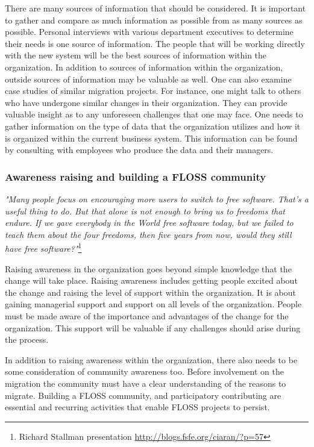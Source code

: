    There are many sources of information that should be considered. It is important to gather and compare as much information as possible from as many sources as possible. Personal interviews with various department executives to determine their needs is one source of information. The people that will be working directly with the new system will be the best sources of information within the organization.  In addition to sources of information within the organization, outside sources of information may be valuable as well. One can also examine case studies of similar migration projects. For instance, one might talk to others who have undergone similar changes in their organization. They can provide valuable insight as to any unforeseen challenges that one may face. One needs to gather information on the type of data that the organization utilizes and how it is organized within the current business system.  This information can be found by consulting with employees who produce the data and their managers.
    
    \subsubsection{Awareness raising and building a FLOSS community}
    
    \textit{ "Many people focus on encouraging more users to switch to free software. That's a useful thing to do. But that alone is not enough to bring us to freedoms that endure. If we gave everybody in the World free software today, but we failed to teach them about the four freedoms, then five years from now, would they still have free software?"}\footnote{Richard Stallman  presentation \url{http://blogs.fsfe.org/ciaran/?p=57}}
    
    Raising awareness in the organization goes beyond simple knowledge that the change will take place. Raising awareness includes getting people excited about the change and raising the level of support within the organization. It is about gaining managerial support and support on all levels of the organization. People must be made aware of the importance and advantages of the change for the organization. This support will be valuable if any challenges should arise during the process. 
    
    In addition to raising awareness within the organization, there also needs to be some consideration of community awareness too. Before involvement on the migration the community must have a clear understanding of the reasons to migrate.
    Building a FLOSS community, and participatory contributing are essential and recurring activities that enable FLOSS projects to persist. 

